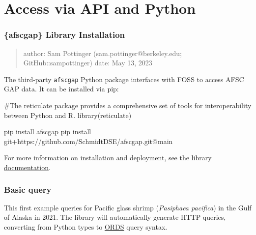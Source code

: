 \documentclass[
  letterpaper,
  oneside,
  open=any]{scrbook}
\newenvironment{Shaded}{\begin{snugshade}}{\end{snugshade}}
\newcommand{\CommentTok}[1]{\textcolor[rgb]{0.37,0.37,0.37}{#1}}
\newcommand{\ErrorTok}[1]{\textcolor[rgb]{0.68,0.00,0.00}{#1}}
\newcommand{\FunctionTok}[1]{\textcolor[rgb]{0.28,0.35,0.67}{#1}}
\newcommand{\NormalTok}[1]{\textcolor[rgb]{0.00,0.23,0.31}{#1}}
\newcommand{\SpecialCharTok}[1]{\textcolor[rgb]{0.37,0.37,0.37}{#1}}
\begin{document}
\hypertarget{access-via-api-and-python}{%
\chapter{Access via API and Python}\label{access-via-api-and-python}}

\hypertarget{afscgap-library-installation}{%
\subsection{\{afscgap\} Library
Installation}\label{afscgap-library-installation}}

\begin{quote}
author: Sam Pottinger (sam.pottinger@berkeley.edu; GitHub::sampottinger)
date: May 13, 2023
\end{quote}

The third-party \texttt{afscgap} Python package interfaces with FOSS to
access AFSC GAP data. It can be installed via pip:

\begin{Shaded}
\begin{Highlighting}[]
\CommentTok{\#The reticulate package provides a comprehensive set of tools for interoperability between Python and R. }
\FunctionTok{library}\NormalTok{(reticulate)}
\end{Highlighting}
\end{Shaded}

\begin{Shaded}
\begin{Highlighting}[]
\NormalTok{pip install afscgap}
\NormalTok{pip install git}\SpecialCharTok{+}\NormalTok{https}\SpecialCharTok{:}\ErrorTok{//}\NormalTok{github.com}\SpecialCharTok{/}\NormalTok{SchmidtDSE}\SpecialCharTok{/}\NormalTok{afscgap.git}\SpecialCharTok{@}\NormalTok{main}
\end{Highlighting}
\end{Shaded}

For more information on installation and deployment, see the
\href{https://pyafscgap.org}{library documentation}.

\hypertarget{basic-query}{%
\subsection{Basic query}\label{basic-query}}

This first example queries for Pacific glass shrimp (\emph{Pasiphaea
pacifica}) in the Gulf of Alaska in 2021. The library will automatically
generate HTTP queries, converting from Python types to
\href{https://www.oracle.com/database/technologies/appdev/rest.html}{ORDS}
query syntax.
\end{document}
